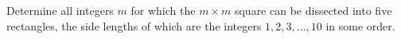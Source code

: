Determine all integers $m$ for which the $m \times m$ square can be dissected into five rectangles, the side lengths of which are the integers $1,2,3,\ldots,10$ in some order.